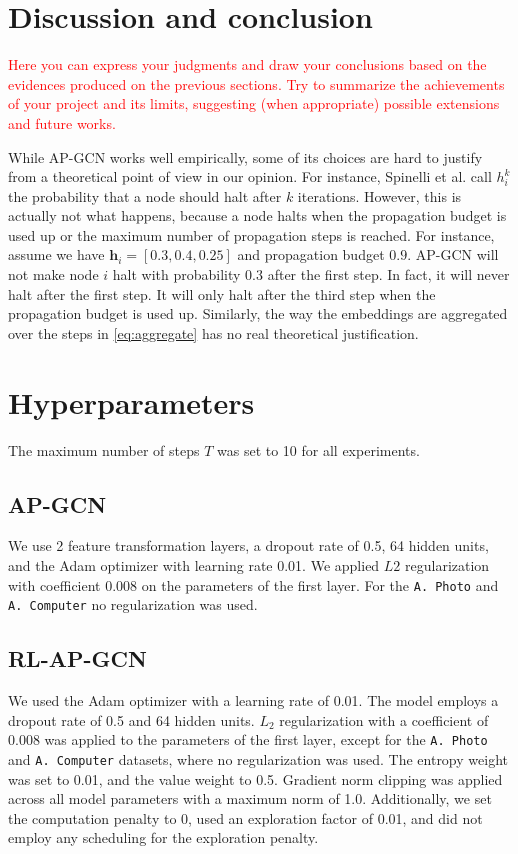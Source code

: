 \documentclass{gdl}
\begin{document}
\section{Discussion and conclusion}

\textcolor{red}{Here you can express your judgments and draw your conclusions based on the  evidences produced on the previous sections.
Try to summarize the achievements of your project and its limits, suggesting (when appropriate) possible extensions and future works.}

While AP-GCN works well empirically, some of its choices are hard to justify from a theoretical point of view in our opinion. For instance, Spinelli et al. call $h_i^k$ the probability that a node should halt after $k$ iterations. However, this is actually not what happens, because a node halts when the propagation budget is used up or the maximum number of propagation steps is reached. For instance, assume we have $\mathbf{h}_i = [0.3, 0.4, 0.25]$ and propagation budget $0.9$. AP-GCN will not make node $i$ halt with probability $0.3$ after the first step. In fact, it will never halt after the first step. It will only halt after the third step when the propagation budget is used up. Similarly, the way the embeddings are aggregated over the steps in \autoref{eq:aggregate} has no real theoretical justification.


\clearpage


\clearpage

\appendix

\section{Hyperparameters}
The maximum number of steps $T$ was set to 10 for all experiments.

\subsection{AP-GCN}
\label{lab:hyper-ap-gcn}
We use 2 feature transformation layers, a dropout rate of 0.5, 64 hidden units, and the Adam optimizer with learning rate 0.01. We applied $L2$ regularization with coefficient 0.008 on the parameters of the first layer. For the \texttt{A. Photo} and \texttt{A. Computer} no regularization was used.

\subsection{RL-AP-GCN}
\label{lab:hyper-rl-gcn}
We used the Adam optimizer with a learning rate of 0.01. The model employs a dropout rate of 0.5 and 64 hidden units. $L_2$ regularization with a coefficient of 0.008 was applied to the parameters of the first layer, except for the \texttt{A. Photo} and \texttt{A. Computer} datasets, where no regularization was used. The entropy weight was set to 0.01, and the value weight to 0.5. Gradient norm clipping was applied across all model parameters with a maximum norm of 1.0. Additionally, we set the computation penalty to 0, used an exploration factor of 0.01, and did not employ any scheduling for the exploration penalty.
\end{document}
